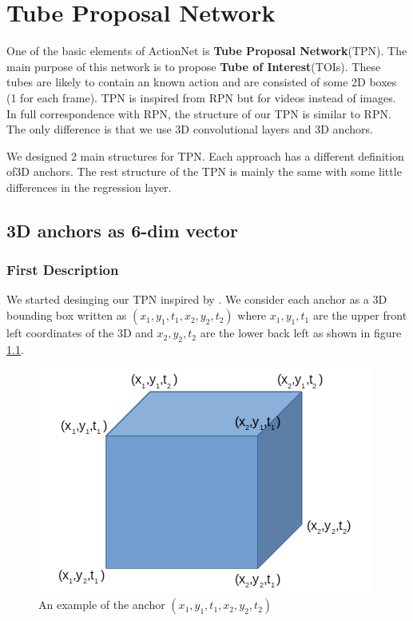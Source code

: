 \documentclass{report}
\begin{document}
\chapter{Tube Proposal Network}

One of the basic elements of ActionNet is \textbf{Tube Proposal Network}(TPN). The main purpose of this network is to propose
\textbf{Tube of Interest}(TOIs). These tubes are likely to contain an known action and are consisted of some 2D boxes
(1 for each frame). TPN is inspired from RPN but for videos instead of images. In full correspondence with RPN, the structure
of our TPN is similar to RPN. The only difference is that we use 3D convolutional layers and 3D anchors. \par
We designed 2 main structures for TPN. Each approach has a different definition of3D anchors. The rest structure of the TPN is mainly the same
with some little differences in the regression layer.
\section{ 3D anchors as 6-dim vector}
\subsection{First Description}
We started desinging our TPN inspired by \cite{}. We consider each anchor as a 3D bounding box written as
$(x_1, y_1, t_1, x_2, y_2, t_2)$ where $x_1, y_1, t_1$
are the upper front left coordinates of the 3D and $x_2, y_2, t_2$ are the lower back left as shown in figure \ref{fig:anchor_6d}.
\begin{figure}[h]
  \centering
  \includegraphics[scale=0.5]{anchor_6d}
  \caption{An example of the anchor $(x_1,y_1,t_1,x_2,y_2,t_2)$}
  \label{fig:anchor_6d}
\end{figure}
\end{document}
